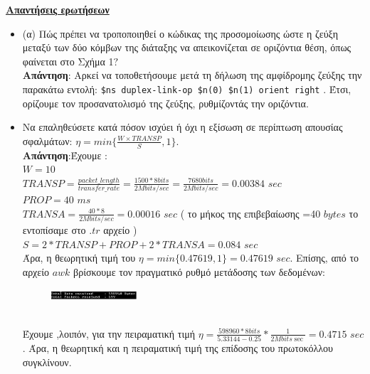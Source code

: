 \documentclass{article}%
\begin{document}
\textbf{\underline{ Απαντήσεις ερωτήσεων}}\\
\begin{itemize}
	\item  (α) Πώς πρέπει να τροποποιηθεί ο κώδικας της προσομοίωσης ώστε η ζεύξη μεταξύ των δύο κόμβων
της διάταξης να απεικονίζεται σε οριζόντια θέση, όπως φαίνεται στο Σχήμα 1$?$ \\
\textbf{Απάντηση}: Αρκεί να τοποθετήσουμε μετά τη δήλωση της αμφίδρομης ζεύξης την παρακάτω εντολή:
 \verb|$ns duplex-link-op $n(0) $n(1) orient right| .
 Έτσι, ορίζουμε τον προσανατολισμό της ζεύξης, ρυθμίζοντάς την οριζόντια.\\
\newpage
\item	Να επαληθεύσετε κατά πόσον ισχύει ή όχι η εξίσωση σε περίπτωση απουσίας σφαλμάτων: $\displaystyle{\eta=min\{\frac{W \times TRANSP}{S},1\}}$.\\
\textbf{Απάντηση}:Έχουμε : \\$W = 10$\\
$TRANSP=\frac{packet\_length}{transfer\_rate}=\frac{1500*8bits}{2Mbits/sec}=\frac{7680bits}{2Mbits/sec}=0.00384$ $sec$\\
$PROP= 40$ $ms$\\
$TRANSA=\frac{40*8}{2Mbits/sec}=0.00016$ $sec$ ( το μήκος της επιβεβαίωσης =40 $bytes$ το εντοπίσαμε στο $.tr$ αρχείο )\\
$S=2*TRANSP + PROP + 2*TRANSA = 0.084$ $sec$\\
Άρα, η θεωρητική τιμή του $\eta=min\{0.47619,1\}=0.47619$ $sec$. 
Επίσης, από το αρχείο $awk$ βρίσκουμε τον πραγματικό ρυθμό μετάδοσης των δεδομένων:
\begin{figure}[htbp]
	\centering
		\includegraphics[width=0.30\textwidth]{2.png}
	\label{fig:2}
\end{figure}\\
Έχουμε ,λοιπόν, για την πειραματική τιμή $\eta = \frac{598960*8bits}{5.33144-0.25}*\frac{1}{2Mbits\sec}=0.4715$ $sec$.
Άρα, η θεωρητική και η πειραματική τιμή της επίδοσης του πρωτοκόλλου συγκλίνουν.\\


\end{itemize}
\end{document}

